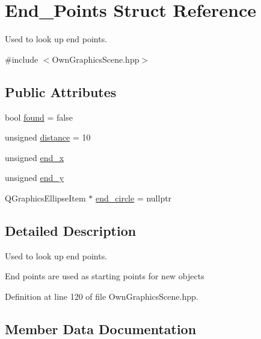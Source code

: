 \hypertarget{structEnd__Points}{}\section{End\+\_\+\+Points Struct Reference}
\label{structEnd__Points}


Used to look up end points.  




{\ttfamily \#include $<$Own\+Graphics\+Scene.\+hpp$>$}

\subsection*{Public Attributes}
\begin{DoxyCompactItemize}
\item 
bool \mbox{\hyperlink{structEnd__Points_aff9dd173210b07bb087d70cf5ec9439f}{found}} = false
\item 
unsigned \mbox{\hyperlink{structEnd__Points_a08442d5de0da7d680a5a0fba7df6cf3b}{distance}} = 10
\item 
unsigned \mbox{\hyperlink{structEnd__Points_a2b33a99792ec437e7c2369ceaf435176}{end\+\_\+x}}
\item 
unsigned \mbox{\hyperlink{structEnd__Points_a04207ee9a97ee6d785b493305cd9e7e8}{end\+\_\+y}}
\item 
Q\+Graphics\+Ellipse\+Item $\ast$ \mbox{\hyperlink{structEnd__Points_abf301947140c1584823b50071c7b8ee6}{end\+\_\+circle}} = nullptr
\end{DoxyCompactItemize}


\subsection{Detailed Description}
Used to look up end points. 

End points are used as starting points for new objects 

Definition at line 120 of file Own\+Graphics\+Scene.\+hpp.



\subsection{Member Data Documentation}
\mbox{\label{structEnd__Points_a08442d5de0da7d680a5a0fba7df6cf3b}} 
